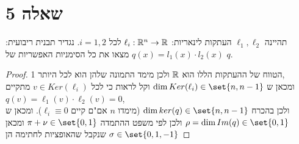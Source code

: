 \documentclass{article}
\DeclarePairedDelimiter\set\{\}
\begin{document}
\pagebreak
\section*{שאלה 5}
    תהיינה $\ell_1, \ell_2$ העתקות לינאריות: $\ell_i: \mathbb{R}^n \rightarrow \mathbb{R}$ לכל $i = 1,2$.
    נגדיר תבנית ריבועית: $q(x) = l_1(x) \cdot l_2(x)$ מצאו את כל הסימניות האפשריות של $q$.
    \begin{proof}
        הטווח של ההעתקות הללו הוא $\mathbb{R}$ ולכן מימד התמונה שלהן הוא לכל היותר 1, \\
        ומכאן ש $\dim Ker(\ell_i) \in \set{n, n-1}$
        וקל לראות כי לכל $v \in Ker(\ell_i)$ מתקיים $q(v) = \ell_1(v) \cdot \ell_2(v) = 0$, \\
        ולכן בהכרח $\dim ker(q) \in \set{n, n-1}$ (מימדו $n$ אם"ם קיים $\ell_i \equiv 0$).
        ומכאן ש $\rho = \dim Im(q) \in \set{0,1}$
        ולכן לפי משפט ההתמדה $\pi + \nu \in \set{0,1}$ ומכאן שנקבל שהאופציות לחתימה הן $\sigma \in \set{0, 1, -1}$
    \end{proof}
\end{document}
